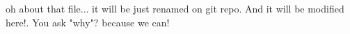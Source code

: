 oh
about that file...
it will be just renamed on git repo.
And it will be modified here!.
You ask "why"?
because we can!
